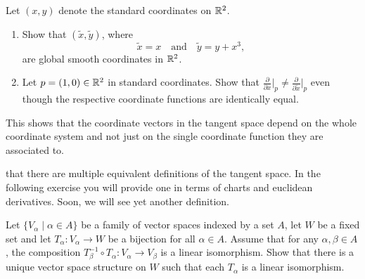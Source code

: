 \begin{exercise}
  Let $(x,y)$ denote the standard coordinates on $\mathbb{R}^2$.
  \begin{enumerate}
    \item Show that $(\widetilde{x}, \widetilde{y})$, where 
    \begin{equation}
      \widetilde{x} = x
      \quad\mbox{and}\quad
      \widetilde{y} = y + x^3,
    \end{equation}
    are global smooth coordinates in $\mathbb{R}^2$.
    \item Let $p=(1,0)\in\mathbb{R}^2$ in standard coordinates.
    Show that $\frac{\partial}{\partial x}\Big|_p \neq \frac{\partial}{\partial \widetilde x}\Big|_p$ even though the respective coordinate functions are identically equal.
  \end{enumerate}
  This shows that the coordinate vectors in the tangent space depend on the whole coordinate system and not just on the single coordinate function they are associated to.
\end{exercise}

 that there are multiple equivalent definitions of the tangent space. In the following exercise you will provide one in terms of charts and euclidean derivatives.
Soon, we will see yet another definition.

\begin{exercise}\label{exe:vsstruct}
  Let $\{V_\alpha \mid \alpha\in A\}$ be a family of vector spaces indexed by a set $A$, let $W$ be a fixed set and let $T_\alpha: V_\alpha\to W$ be a bijection for all $\alpha\in A$.
  Assume that for any $\alpha, \beta \in A$, the composition $T_\beta^{-1}\circ T_\alpha : V_\alpha \to V_\beta$ is a linear isomorphism.
  Show that there is a unique vector space structure on $W$ such that each $T_\alpha$ is a linear isomorphism.
\end{exercise}

